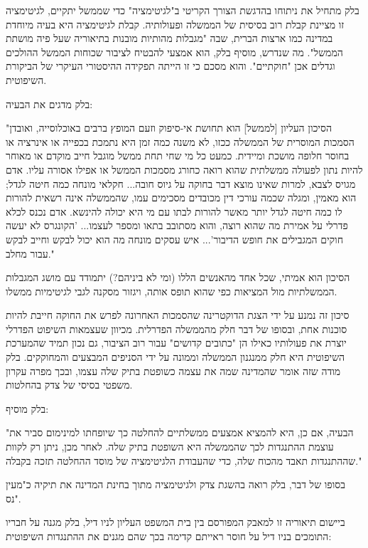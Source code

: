 \documentclass[10pt,oneside]{book}
\begin{document}
בלק מתחיל את ניתוחו בהדגשת הצורך הקריטי ב"לגיטימציה" כדי שממשל יתקיים, לגיטימציה זו מציינת קבלת רוב בסיסית של הממשלה ופעולותיה. קבלת לגיטימציה היא בעיה מיוחדת במדינה כמו ארצות הברית, שבה "מגבלות מהותיות מובנות בתיאוריה שעל פיה מושתת הממשל". מה שנדרש, מוסיף בלק, הוא אמצעי להבטיח לציבור שכוחות הממשל ההולכים וגדלים אכן "חוקתיים". והוא מסכם כי זו הייתה תפקידה ההיסטורי העיקרי של הביקורת השיפוטית.

בלק מדגים את הבעיה:

\begin{quoting}
"הסיכון העליון [לממשל] הוא תחושת אי-סיפוק וזעם המופץ ברבים באוכלוסייה, ואובדן הסמכות המוסרית של הממשלה ככזו, לא משנה כמה זמן היא נתמכת בכפייה או אינרציה או בחוסר חלופה מושכת ומיידית. כמעט כל מי שחי תחת ממשל מוגבל חייב מוקדם או מאוחר להיות נתון לפעולה ממשלתית שהוא רואה כחורג מסמכות הממשל או אפילו אסורה עליו. אדם מגויס לצבא, למרות שאינו מוצא דבר בחוקה על גיוס חובה... חקלאי מונחה כמה חיטה לגדל; הוא מאמין, ומגלה שכמה עורכי דין מכובדים מסכימים עמו, שהממשלה אינה רשאית להורות לו כמה חיטה לגדל יותר מאשר להורות לבתו עם מי היא יכולה להינשא. אדם נכנס לכלא פדרלי על אמירת מה שהוא רוצה, והוא מסתובב בתאו ומספר לעצמו... 'הקונגרס לא יעשה חוקים המגבילים את חופש הדיבור'... איש עסקים מונחה מה הוא יכול לבקש וחייב לבקש עבור מחלב."
\end{quoting}

הסיכון הוא אמיתי, שכל אחד מהאנשים הללו (ומי לא ביניהם?) יתמודד עם מושג המגבלות הממשלתיות מול המציאות כפי שהוא תופס אותה, ויגזור מסקנה לגבי לגיטימיות ממשלו.

סיכון זה נמנע על ידי הצגת הדוקטרינה שהסמכות האחרונה לפרש את החוקה חייבת להיות סוכנות אחת, ובסופו של דבר חלק מהממשלה הפדרלית. מכיוון שעצמאות השיפוט הפדרלי יוצרת את פעולותיו כאילו הן "כתובים קדושים" עבור רוב הציבור, גם נכון תמיד שהמערכת השיפוטית היא חלק ממנגנון הממשלה וממונה על ידי הסניפים המבצעים והמחוקקים. בלק מודה שזה אומר שהמדינה שמה את עצמה כשופטת בתיק שלה עצמו, ובכך מפרה עקרון משפטי בסיסי של צדק בהחלטות.

בלק מוסיף:

\begin{quoting}
"הבעיה, אם כן, היא להמציא אמצעים ממשלתיים להחלטה כך שיופחתו למינימום סביר את עוצמת ההתנגדות לכך שהממשלה היא השופטת בתיק שלה. לאחר מכן, ניתן רק לקוות שההתנגדות תאבד מהכוח שלה, כדי שהעבודת הלגיטימציה של מוסד ההחלטה תזכה בקבלה."
\end{quoting}

בסופו של דבר, בלק רואה בהשגת צדק ולגיטימציה מתוך בחינת המדינה את תיקיה כ"מעין נס".

ביישום תיאוריה זו למאבק המפורסם בין בית המשפט העליון לניו דיל, בלק מגנה על חבריו התומכים בניו דיל על חוסר ראייתם קדימה בכך שהם מגנים את ההתנגדות השיפוטית:
\end{document}
